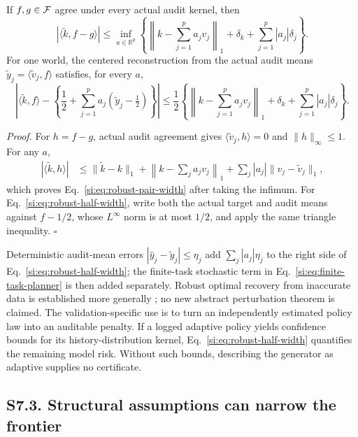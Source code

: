 \begin{proposition}
\label{si:prop:kernel-perturbation}
If $f,g\in\mathcal F$ agree under every actual audit kernel, then
\begin{equation}
|\langle\widetilde k,f-g\rangle|
\le
\inf_{a\in\mathbb R^p}
\left\{
\left\|k-\sum_{j=1}^p a_jv_j\right\|_1
+\delta_k+\sum_{j=1}^p|a_j|\delta_j
\right\}.
\label{si:eq:robust-pair-width}
\end{equation}
For one world, the centered reconstruction from the actual audit means $\widetilde y_j=\langle\widetilde v_j,f\rangle$ satisfies, for every $a$,
\begin{equation}
\left|
\langle\widetilde k,f\rangle
-\left\{\frac12+\sum_{j=1}^p a_j(\widetilde y_j-\tfrac12)\right\}
\right|
\le\frac12
\left\{
\left\|k-\sum_{j=1}^p a_jv_j\right\|_1
+\delta_k+\sum_{j=1}^p|a_j|\delta_j
\right\}.
\label{si:eq:robust-half-width}
\end{equation}
\end{proposition}

\noindent\textit{Proof.}
For $h=f-g$, actual audit agreement gives $\langle\widetilde v_j,h\rangle=0$ and $\|h\|_\infty\le1$. For any $a$,
\begin{align}
|\langle\widetilde k,h\rangle|
&\le \|\widetilde k-k\|_1
+\left\|k-\sum_ja_jv_j\right\|_1
+\sum_j|a_j|\|v_j-\widetilde v_j\|_1,
\end{align}
which proves Eq.~\ref{si:eq:robust-pair-width} after taking the infimum. For Eq.~\ref{si:eq:robust-half-width}, write both the actual target and audit means against $f-1/2$, whose $L^\infty$ norm is at most $1/2$, and apply the same triangle inequality. \hfill$\square$

Deterministic audit-mean errors $|\widehat y_j-\widetilde y_j|\le\eta_j$ add $\sum_j|a_j|\eta_j$ to the right side of Eq.~\ref{si:eq:robust-half-width}; the finite-task stochastic term in Eq.~\ref{si:eq:finite-task-planner} is then added separately. Robust optimal recovery from inaccurate data is established more generally \citep{ettehad2021}; no new abstract perturbation theorem is claimed. The validation-specific use is to turn an independently estimated policy law into an auditable penalty. If a logged adaptive policy yields confidence bounds for its history-distribution kernel, Eq.~\ref{si:eq:robust-half-width} quantifies the remaining model risk. Without such bounds, describing the generator as adaptive supplies no certificate.

\subsection*{S7.3. Structural assumptions can narrow the frontier}

